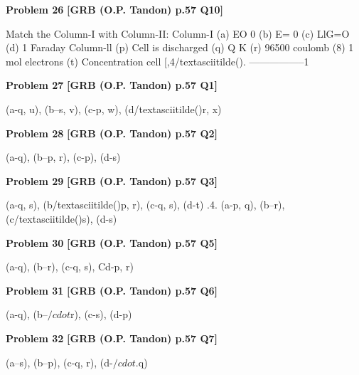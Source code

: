 \begin{problembox}
\textbf{Problem 26} \hfill \textbf{[GRB (O.P. Tandon) p.57 Q10]}
\label{q:ext-grb_all_questions-26}

Match the Column-I with Column-II: 
Column-I 
(a) EO 
0 
(b) E= 0 
(c) LlG=O 
(d) 1 Faraday 
Column-ll 
(p) Cell is discharged 
(q) Q K 
(r) 96500 coulomb 
(8) 1 mol electrons 
(t) Concentration cell 
[,4/textasciitilde(). -----------------1
\end{problembox}

\begin{problembox}
\textbf{Problem 27} \hfill \textbf{[GRB (O.P. Tandon) p.57 Q1]}
\label{q:ext-grb_all_questions-27}

(a-q, u), (b--s, v), (c-p, w), (d/textasciitilde()r, x)
\end{problembox}

\begin{problembox}
\textbf{Problem 28} \hfill \textbf{[GRB (O.P. Tandon) p.57 Q2]}
\label{q:ext-grb_all_questions-28}

(a-q), (b--p, r), (c-p), (d-s)
\end{problembox}

\begin{problembox}
\textbf{Problem 29} \hfill \textbf{[GRB (O.P. Tandon) p.57 Q3]}
\label{q:ext-grb_all_questions-29}

(a-q, s), (b/textasciitilde()p, r), (c-q, s), (d-t) 
.4. 
(a-p, q), (b--r), (c/textasciitilde()s), (d-s)
\end{problembox}

\begin{problembox}
\textbf{Problem 30} \hfill \textbf{[GRB (O.P. Tandon) p.57 Q5]}
\label{q:ext-grb_all_questions-30}

(a-q), (b--r), (c-q, s), Cd-p, r)
\end{problembox}

\begin{problembox}
\textbf{Problem 31} \hfill \textbf{[GRB (O.P. Tandon) p.57 Q6]}
\label{q:ext-grb_all_questions-31}

(a-q), (b--$/cdot$r), (c-s), (d-p)
\end{problembox}

\begin{problembox}
\textbf{Problem 32} \hfill \textbf{[GRB (O.P. Tandon) p.57 Q7]}
\label{q:ext-grb_all_questions-32}

(a--s), (b--p), (c-q, r), (d-$/cdot$.q)
\end{problembox}

